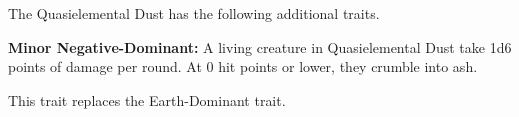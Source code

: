The Quasielemental Dust has the following additional traits.
\begin{itemize*}
\item \textbf{Minor Negative-Dominant:} A living creature in Quasielemental Dust take 1d6 points of damage per round. At 0 hit points or lower, they crumble into ash.

This trait replaces the Earth-Dominant trait.
\end{itemize*}
